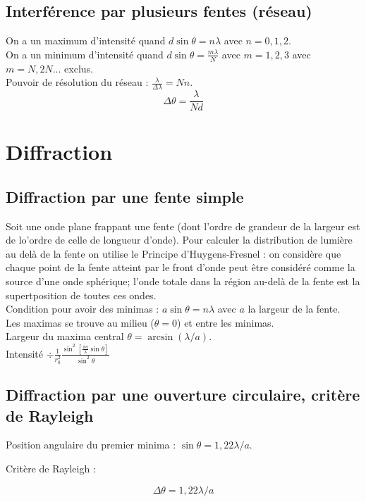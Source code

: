 \documentclass[a4paper,10pt,openright,titlepage]{report}
\begin{document}
\subsection{Interférence par plusieurs fentes (réseau)}

On a un maximum d'intensité quand $d \sin \theta = n \lambda$ avec $n = 0,1,2$.\\

On a un minimum d'intensité quand $d \sin \theta =\frac{m \lambda }{N}$ avec $m=1,2,3$ avec $m = N, 2N...$ exclus.\\

Pouvoir de résolution du réseau : $\frac{\lambda}{\Delta \lambda} = N n$.\\

$$\Delta \theta = \frac{\lambda}{N d}$$

\section{Diffraction}
\subsection{Diffraction par une fente simple}
Soit une onde plane frappant une fente (dont l'ordre de grandeur de la largeur est de lo'ordre de celle de longueur d'onde). Pour calculer la distribution de lumière au delà de la fente on utilise le Principe d'Huygens-Fresnel : on considère que chaque point de la fente atteint par le front d'onde peut être considéré comme la source d'une onde sphérique; l'onde totale dans la région au-delà de la fente est la supertposition de toutes ces ondes.\\

Condition pour avoir des minimas : $a \sin \theta = n \lambda$ avec $a$ la largeur de la fente.\\

Les maximas se trouve au milieu ($\theta = 0$) et entre les minimas.\\

Largeur du maxima central $\theta = \arcsin (\lambda / a)$.\\

Intensité $\div \frac{1}{r_0^2} \frac{\sin^2 \left[ \frac{\pi a}{\lambda} \sin \theta \right]}{\sin^2 \theta}$

\subsection{Diffraction par une ouverture circulaire, critère de Rayleigh}

Position angulaire du premier minima : $\sin \theta = 1,22 \lambda / a$.

Critère de Rayleigh :

$$\Delta \theta = 1,22 \lambda / a$$
\end{document}
